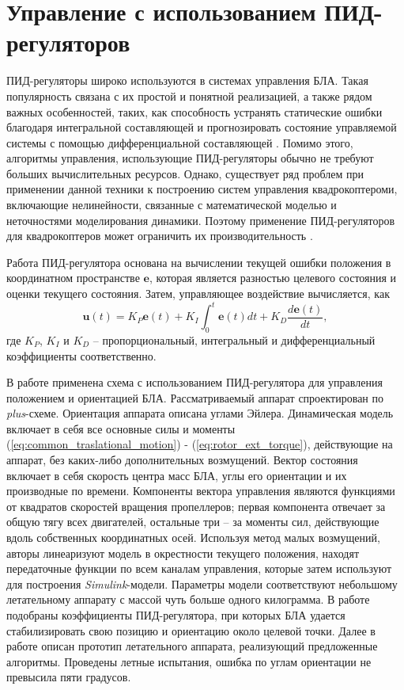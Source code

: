 \section{Управление с использованием ПИД-регуляторов}

ПИД-регуляторы широко используются в системах управления БЛА.
Такая популярность связана с их простой и понятной реализацией, а также рядом важных особенностей, таких, как способность устранять статические ошибки благодаря интегральной составляющей и прогнозировать состояние управляемой системы с помощью дифференциальной составляющей  \cite{Astrom01}.
Помимо этого, алгоритмы управления, использующие ПИД-регуляторы обычно не требуют больших вычислительных ресурсов.
Однако, существует ряд проблем при применении данной техники к построению систем управления квадрокоптероми, включающие нелинейности, связанные с математической моделью и неточностями моделирования динамики.
Поэтому применение ПИД-регуляторов для квадрокоптеров может ограничить их производительность \cite{Zulu01}.

Работа ПИД-регулятора основана на вычислении текущей ошибки положения в координатном пространстве $\bm{e}$, которая является разностью целевого состояния и оценки текущего состояния. Затем, управляющее воздействие вычисляется, как
\begin{equation} \label{eq:pid_common}
\bm{u}(t) = K_P \bm{e}(t) + K_I\int_0^t \bm{e}(t) dt + K_D \frac{d\bm{e}(t)}{dt},
\end{equation}
где $K_P$, $K_I$ и $K_D$ -- пропорциональный, интегральный и дифференциальный коэффициенты соответственно.

В работе \cite{Li01} применена схема с использованием ПИД-регулятора для управления положением и ориентацией БЛА.
Рассматриваемый аппарат спроектирован по \textit{plus}-схеме.
Ориентация аппарата описана углами Эйлера.
Динамическая модель включает в себя все основные силы и моменты (\ref{eq:common_traslational_motion}) - (\ref{eq:rotor_ext_torque}), действующие на аппарат, без каких-либо дополнительных возмущений.
Вектор состояния включает в себя скорость центра масс БЛА, углы его ориентации и их производные по времени.
Компоненты вектора управления являются функциями от квадратов скоростей вращения пропеллеров; первая компонента отвечает за общую тягу всех двигателей, остальные три -- за моменты сил, действующие вдоль собственных координатных осей.
Используя метод малых возмущений, авторы линеаризуют модель в окрестности текущего положения, находят передаточные функции по всем каналам управления, которые затем используют для построения \textit{Simulink}-модели.
Параметры модели соответствуют небольшому летательному аппарату с массой чуть больше одного килограмма.
В работе подобраны коэффициенты ПИД-регулятора, при которых БЛА удается стабилизировать свою позицию и ориентацию около целевой точки.
Далее в работе описан прототип летательного аппарата, реализующий предложенные алгоритмы.
Проведены летные испытания, ошибка по углам ориентации не превысила пяти градусов.

